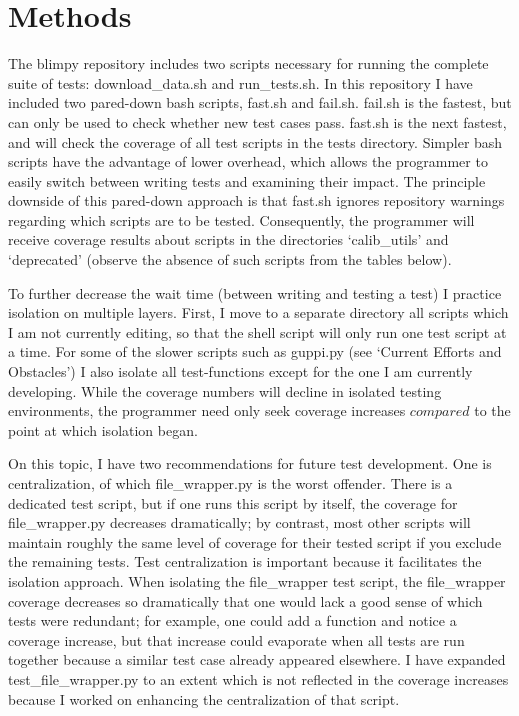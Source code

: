 \documentclass[12pt]{article}
\begin{document}
\section{Methods}

\quad \quad The blimpy repository includes two scripts necessary for running the complete suite of tests: download\_data.sh and run\_tests.sh. In this repository I have included two pared-down bash scripts, fast.sh and fail.sh. fail.sh is the fastest, but can only be used to check whether new test cases pass. fast.sh is the next fastest, and will check the coverage of all test scripts in the tests directory. Simpler bash scripts have the advantage of lower overhead, which allows the programmer to easily switch between writing tests and examining their impact. The principle downside of this pared-down approach is that fast.sh ignores repository warnings regarding which scripts are to be tested. Consequently, the programmer will receive coverage results about scripts in the directories `calib\_utils' and `deprecated' (observe the absence of such scripts from the tables below).

To further decrease the wait time (between writing and testing a test) I practice isolation on multiple layers. First, I move to a separate directory all scripts which I am not currently editing, so that the shell script will only run one test script at a time. For some of the slower scripts such as guppi.py (see `Current Efforts and Obstacles') I also isolate all test-functions except for the one I am currently developing. While the coverage numbers will decline in isolated testing environments, the programmer need only seek coverage increases $compared$ to the point at which isolation began.

On this topic, I have two recommendations for future test development. One is centralization, of which file\_wrapper.py is the worst offender. There is a dedicated test script, but if one runs this script by itself, the coverage for file\_wrapper.py decreases dramatically; by contrast, most other scripts will maintain roughly the same level of coverage for their tested script if you exclude the remaining tests. Test centralization is important because it facilitates the isolation approach. When isolating the file\_wrapper test script, the file\_wrapper coverage decreases so dramatically that one would lack a good sense of which tests were redundant; for example, one could add a function and notice a coverage increase, but that increase could evaporate when all tests are run together because a similar test case already appeared elsewhere. I have expanded test\_file\_wrapper.py to an extent which is not reflected in the coverage increases because I worked on enhancing the centralization of that script.
\end{document}

